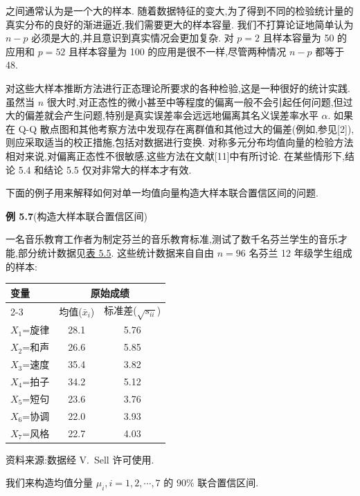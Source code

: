 之间通常认为是一个大的样本. 随着数据特征的变大,为了得到不同的检验统计量的真实分布的良好的渐进逼近,我们需要更大的样本容量. 我们不打算论证地简单认为 $n-p$ 必须是大的,并且意识到真实情况会更加复杂. 对 $p=2$ 且样本容量为 50 的应用和 $p=52$ 且样本容量为 100 的应用是很不一样,尽管两种情况 $n-p$ 都等于 48.

对这些大样本推断方法进行正态理论所要求的各种检验,这是一种很好的统计实践. 虽然当 $n$ 很大时,对正态性的微小甚至中等程度的偏离一般不会引起任何问题,但过大的偏差就会产生问题,特别是真实误差率会远远地偏离其名义误差率水平 $\alpha$. 如果在 Q-Q 散点图和其他考察方法中发现存在离群值和其他过大的偏差(例如,参见[2]),则应采取适当的校正措施,包括对数据进行变换. 对称多元分布均值向量的检验方法相对来说,对偏离正态性不很敏感,这些方法在文献[11]中有所讨论. 在某些情形下,结论 5.4 和结论 5.5 仅对非常大的样本才有效.

下面的例子用来解释如何对单一均值向量构造大样本联合置信区间的问题.

\noindent\textbf{例 5.7}\quad (构造大样本联合置信区间)

一名音乐教育工作者为制定芬兰的音乐教育标准,测试了数千名芬兰学生的音乐才能,部分统计数据见\hyperref[tab:5.5]{表 5.5}. 这些统计数据来自自由 $n=96$ 名芬兰 12 年级学生组成的样本:

\begin{mvtable}
\label{tab:5.5}
\begin{tabular}{lcc}
\toprule
\multirow{2}{*}{变量} & \multicolumn{2}{c}{原始成绩}\\
\cmidrule(lr){2-3}
 & 均值($\bar{x}_i$) & 标准差($\sqrt{s_{ii}}$)\\
\midrule
$X_1$=旋律 & 28.1 & 5.76\\
$X_2$=和声 & 26.6 & 5.85\\
$X_3$=速度 & 35.4 & 3.82\\
$X_4$=拍子 & 34.2 & 5.12\\
$X_5$=短句 & 23.6 & 3.76\\
$X_6$=协调 & 22.0 & 3.93\\
$X_7$=风格 & 22.7 & 4.03\\
\bottomrule
\end{tabular}
\end{mvtable}

资料来源:数据经 V.\ Sell 许可使用.

我们来构造均值分量 $\mu_i,i=1,2,\cdots,7$ 的 $90\%$ 联合置信区间.

